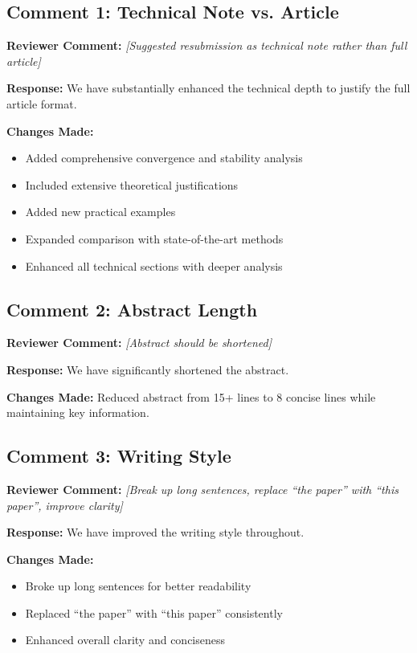 \documentclass[11pt]{article}
\newcommand{\reviewercomment}[1]{\textbf{Reviewer Comment:} \textit{#1}}
\newcommand{\response}[1]{\textbf{Response:} #1}
\newcommand{\changes}[1]{\textbf{Changes Made:} #1}
\begin{document}
\subsection*{Comment 1: Technical Note vs. Article}

\reviewercomment{[Suggested resubmission as technical note rather than full article]}

\response{We have substantially enhanced the technical depth to justify the full article format.}

\changes{
\begin{itemize}
\item Added comprehensive convergence and stability analysis
\item Included extensive theoretical justifications
\item Added new practical examples
\item Expanded comparison with state-of-the-art methods
\item Enhanced all technical sections with deeper analysis
\end{itemize}
}

\subsection*{Comment 2: Abstract Length}

\reviewercomment{[Abstract should be shortened]}

\response{We have significantly shortened the abstract.}

\changes{Reduced abstract from 15+ lines to 8 concise lines while maintaining key information.}

\subsection*{Comment 3: Writing Style}

\reviewercomment{[Break up long sentences, replace ``the paper'' with ``this paper'', improve clarity]}

\response{We have improved the writing style throughout.}

\changes{
\begin{itemize}
\item Broke up long sentences for better readability
\item Replaced ``the paper'' with ``this paper'' consistently
\item Enhanced overall clarity and conciseness
\end{itemize}
}
\end{document}
